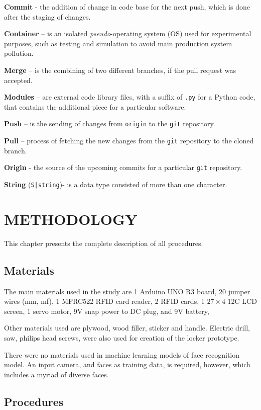 \documentclass[12pt]{article}
\begin{document}
\textbf{Commit} - the addition of change in code base for the next push, which is done after the staging of changes. 

\textbf{Container} – is an isolated \textit{pseudo}-operating system (OS) used for experimental purposes, such as testing and simulation to avoid main production system pollution.

\textbf{Merge} – is the combining of two different branches, if the pull request was accepted.

\textbf{Modules} – are external code library files, with a suffix of \texttt{.py} for a Python code, that contains the additional piece for a particular software.

\textbf{Push} – is the sending of changes from \texttt{origin} to the \texttt{git} repository.

\textbf{Pull} – process of fetching the new changes from the \texttt{git} repository to the cloned branch.

\textbf{Origin} - the source of the upcoming commits for a particular \texttt{git} repository.

\textbf{String} (\texttt{S|string})- is a data type consisted of more than one character.

\newpage
\section*{METHODOLOGY\centering}

This chapter presents the complete description of all procedures. 

\subsection*{Materials\centering}

The main materials used in the study are 1 Arduino UNO R3 board, 20 jumper wires (mm, mf), 1 MFRC522 RFID card reader, 2 RFID cards, 1 $27 \times 4$ 12C LCD screen, 1 servo motor, 9V snap power to DC plug, and 9V battery,

Other materials used are plywood, wood filler, sticker and handle. Electric drill, saw, philips head screws, were also used for creation of the locker prototype.

There were no materials used in machine learning models of face recognition model. An input camera, and faces as training data, is required, however, which includes a myriad of diverse faces.

\subsection*{Procedures\centering}
\end{document}
